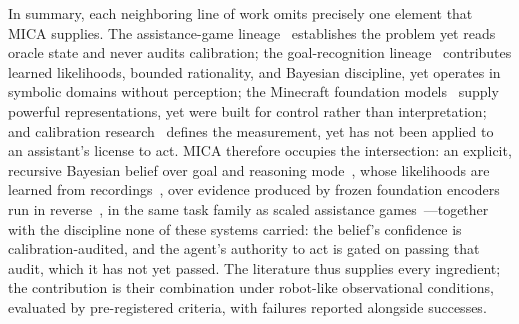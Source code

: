 \documentclass[12pt]{article}
\begin{document}
In summary, each neighboring line of work omits precisely one element that MICA
supplies. The assistance-game lineage~\cite{cirl,wah,nopa,assistancezero}
establishes the problem yet reads oracle state and never audits calibration; the
goal-recognition lineage~\cite{grail,sips,clips} contributes learned
likelihoods, bounded rationality, and Bayesian discipline, yet operates in
symbolic domains without perception; the Minecraft foundation
models~\cite{vpt,minedojo,steve1} supply powerful representations, yet were
built for control rather than interpretation; and calibration
research~\cite{guo} defines the measurement, yet has not been applied to an
assistant's license to act. MICA therefore occupies the intersection: an
explicit, recursive Bayesian belief over goal and reasoning
mode~\cite{sips,clips}, whose likelihoods are learned from
recordings~\cite{grail}, over evidence produced by frozen foundation encoders
run in reverse~\cite{vpt,minedojo,uni3d}, in the same task family as scaled
assistance games~\cite{assistancezero}---together with the discipline none of
these systems carried: the belief's confidence is calibration-audited, and the
agent's authority to act is gated on passing that audit, which it has not yet
passed. The literature thus supplies every ingredient; the contribution is
their combination under robot-like observational conditions, evaluated by
pre-registered criteria, with failures reported alongside successes.
\end{document}
